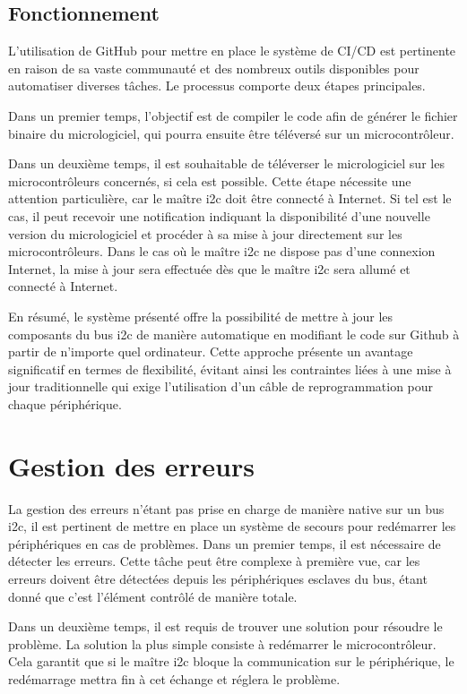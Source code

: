 \subsection{Fonctionnement}

L'utilisation de GitHub pour mettre en place le système de CI/CD est pertinente en raison de sa vaste communauté et des nombreux outils disponibles pour automatiser diverses tâches.
Le processus comporte deux étapes principales.

Dans un premier temps, l'objectif est de compiler le code afin de générer le fichier binaire du micrologiciel, qui pourra ensuite être téléversé sur un microcontrôleur.

Dans un deuxième temps, il est souhaitable de téléverser le micrologiciel sur les microcontrôleurs concernés, si cela est possible.
Cette étape nécessite une attention particulière, car le maître \gls{i2c} doit être connecté à Internet.
Si tel est le cas, il peut recevoir une notification indiquant la disponibilité d'une nouvelle version du micrologiciel et procéder à sa mise à jour directement sur les microcontrôleurs. Dans le cas où le maître \gls{i2c} ne dispose pas d'une connexion Internet, la mise à jour sera effectuée dès que le maître \gls{i2c} sera allumé et connecté à Internet.

En résumé, le système présenté offre la possibilité de mettre à jour les composants du bus \gls{i2c} de manière automatique en modifiant le code sur Github à partir de n'importe quel ordinateur.
Cette approche présente un avantage significatif en termes de flexibilité, évitant ainsi les contraintes liées à une mise à jour traditionnelle qui exige l'utilisation d'un câble de reprogrammation pour chaque périphérique.

\section{Gestion des erreurs}

La gestion des erreurs n'étant pas prise en charge de manière native sur un bus \gls{i2c}, il est pertinent de mettre en place un système de secours pour redémarrer les périphériques en cas de problèmes.
Dans un premier temps, il est nécessaire de détecter les erreurs.
Cette tâche peut être complexe à première vue, car les erreurs doivent être détectées depuis les périphériques esclaves du bus, étant donné que c'est l'élément contrôlé de manière totale.

Dans un deuxième temps, il est requis de trouver une solution pour résoudre le problème.
La solution la plus simple consiste à redémarrer le microcontrôleur.
Cela garantit que si le maître \gls{i2c} bloque la communication sur le périphérique, le redémarrage mettra fin à cet échange et réglera le problème.


